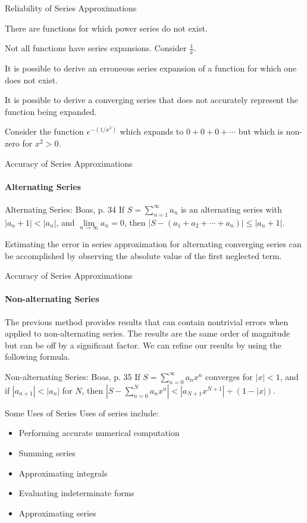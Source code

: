 \documentclass{beamer}
\begin{document}
\begin{frame}{Reliability of Series Approximations}
	\begin{alertblock}{}
	There are functions for which power series do not exist.
	\end{alertblock}
	Not all functions have series expansions.  Consider $\frac{1}{x}$.
	\begin{alertblock}{}
	It is possible to derive an erroneous series expansion of a function for which one does not exist.
	\end{alertblock}
	\begin{alertblock}{}
	It is possible to derive a converging series that does not accurately represent the function being expanded.
	\end{alertblock}
	Consider the function $e^{-(1/x^2)}$ which expands to $0+0+0+\cdots$ but which is non-zero for $x^2>0$.
\end{frame}
  
\begin{frame}{Accuracy of Series Approximations}
	\framesubtitle{Alternating Series}
	\begin{block}{Alternating Series: Boas, p. 34}
	If $S=\sum\limits_{n=1}^\infty a_n$ is an alternating series with $|a_n+1|<|a_n|$, and $\lim\limits_{n\to\infty}a_n=0$, then $|S-(a_1+a_2+\cdots +a_n)|\leq |a_n+1|$.
	\end{block}
	Estimating the error in series approximation for alternating converging series can be accomplished by observing the absolute value of the first neglected term.
\end{frame}
  
\begin{frame}{Accuracy of Series Approximations}
	\framesubtitle{Non-alternating Series}
	The previous method provides results that can contain nontrivial errors when applied to non-alternating series.  The results are the same order of magnitude but can be off by a significant factor.  We can refine our results by using the following formula.
	\begin{block}{Non-alternating Series: Boas, p. 35}
	If $S=\sum\limits_{n=0}^\infty a_n x^n$ converges for $|x|<1$, and if $|a_{n+1}|<|a_n|$ for $N$, then $\left\lvert S-\sum\limits_{n=0}^N a_n x^n \right\rvert<|a_{N+1}x^{N+1}|\div(1-|x|)$.
	\end{block}
\end{frame}
  
\begin{frame}{Some Uses of Series}
	Uses of series include:
	\begin{itemize}
		\item Performing accurate numerical computation
		\item Summing series
		\item Approximating integrals
		\item Evaluating indeterminate forms
		\item Approximating series
	\end{itemize}
\end{frame}
\end{document}
